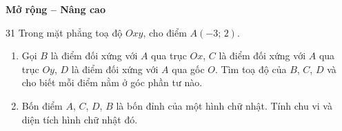 \documentclass[11pt]{article}
\newenvironment{probbox}[2]{\begin{probboxT}{#1}{#2}}{\end{probboxT}}
\newcommand{\dividerbar}[1]{\par\vspace{0.6em}\noindent
  \begin{tcolorbox}[enhanced,frame hidden,interior hidden,borderline west={5pt}{0pt}{ProbBlue},
    colback=white,left=12pt,right=12pt,top=5pt,bottom=5pt,arc=4pt]
  {\large\bfseries\color{ProbBlue} #1}\end{tcolorbox}\vspace{0.4em}}
\begin{document}
\clearpage
\dividerbar{Mở rộng -- Nâng cao}

\begin{probbox}{31}{\relax}
Trong mặt phẳng toạ độ $Oxy$, cho điểm $A(-3;\,2)$.
\begin{enumerate}[label=\alph*),leftmargin=1.6em,itemsep=0pt,topsep=2pt]
  \item Gọi $B$ là điểm đối xứng với $A$ qua trục $Ox$, $C$ là điểm đối xứng với $A$ qua trục $Oy$, $D$ là điểm đối xứng với $A$ qua gốc $O$. Tìm toạ độ của $B$, $C$, $D$ và cho biết mỗi điểm nằm ở góc phần tư nào.
  \item Bốn điểm $A$, $C$, $D$, $B$ là bốn đỉnh của một hình chữ nhật. Tính chu vi và diện tích hình chữ nhật đó.
\end{enumerate}
\end{probbox}
\end{document}
